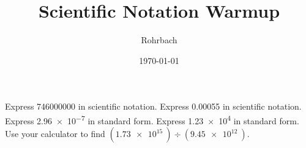 \documentclass[10pt]{exam}
\title{Scientific Notation Warmup}
\author{Rohrbach}
\date{\today}
\begin{document}
\maketitle

\begin{questions}
  \question 
    Express \SI{746000000}{} in scientific notation.
    \vs
  \question 
    Express \SI{0.00055}{} in scientific notation.
    \vs
  \question 
    Express \SI{2.96e-7}{} in standard form.
    \vs
  \question
    Express \SI{1.23e4}{} in standard form.
    \vs
  \question 
    Use your calculator to find 
    $
    \left( \SI{1.73e15}{} \right) \div 
    \left( \SI{9.45e12}{} \right)
    $.
    \vs
  
\end{questions}
\end{document}

